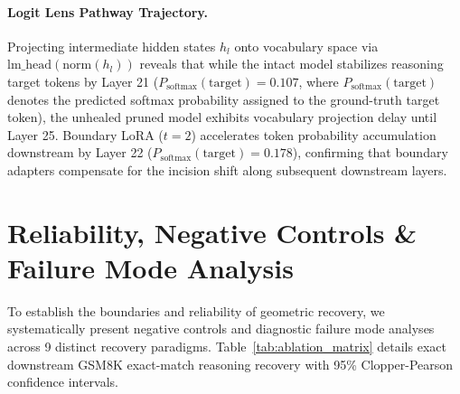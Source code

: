 \documentclass[11pt]{article}
\begin{document}
\paragraph{Logit Lens Pathway Trajectory.}
Projecting intermediate hidden states $h_l$ onto vocabulary space via $\mathrm{lm\_head}(\mathrm{norm}(h_l))$ reveals that while the intact model stabilizes reasoning target tokens by Layer 21 ($P_{\text{softmax}}(\text{target}) = 0.107$, where $P_{\text{softmax}}(\text{target})$ denotes the predicted softmax probability assigned to the ground-truth target token), the unhealed pruned model exhibits vocabulary projection delay until Layer 25. Boundary LoRA ($t=2$) accelerates token probability accumulation downstream by Layer 22 ($P_{\text{softmax}}(\text{target}) = 0.178$), confirming that boundary adapters compensate for the incision shift along subsequent downstream layers.

\section{Reliability, Negative Controls \& Failure Mode Analysis}

To establish the boundaries and reliability of geometric recovery, we systematically present negative controls and diagnostic failure mode analyses across 9 distinct recovery paradigms. Table~\ref{tab:ablation_matrix} details exact downstream GSM8K exact-match reasoning recovery with 95\% Clopper-Pearson confidence intervals.
\end{document}
